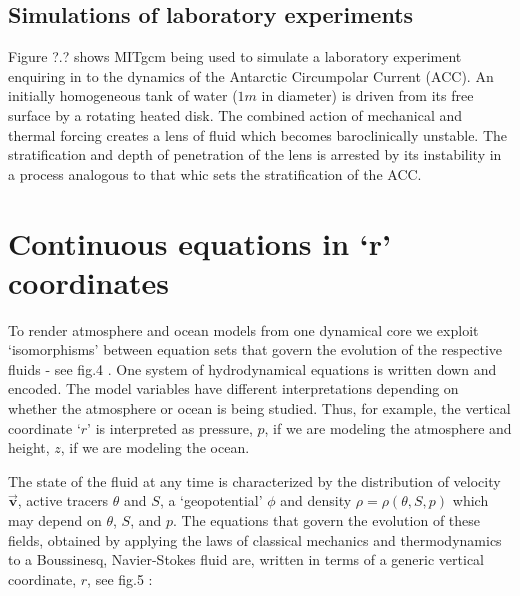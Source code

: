 \documentclass[12pt]{book}
\begin{document}

\subsection{Simulations of laboratory experiments}

Figure ?.? shows MITgcm being used to simulate a laboratory experiment
enquiring in to the dynamics of the Antarctic Circumpolar Current (ACC). An
initially homogeneous tank of water ($1m$ in diameter) is driven from its
free surface by a rotating heated disk. The combined action of mechanical
and thermal forcing creates a lens of fluid which becomes baroclinically
unstable. The stratification and depth of penetration of the lens is
arrested by its instability in a process analogous to that whic sets the
stratification of the ACC.



\section{Continuous equations in `r' coordinates}

To render atmosphere and ocean models from one dynamical core we exploit
`isomorphisms' between equation sets that govern the evolution of the
respective fluids - see fig.4
. One system of hydrodynamical equations is written down
and encoded. The model variables have different interpretations depending on
whether the atmosphere or ocean is being studied. Thus, for example, the
vertical coordinate `$r$' is interpreted as pressure, $p$, if we are
modeling the atmosphere and height, $z$, if we are modeling the ocean.


The state of the fluid at any time is characterized by the distribution of
velocity $\vec{\mathbf{v}}$, active tracers $\theta $ and $S$, a
`geopotential' $\phi $ and density $\rho =\rho (\theta ,S,p)$ which may
depend on $\theta $, $S$, and $p$. The equations that govern the evolution
of these fields, obtained by applying the laws of classical mechanics and
thermodynamics to a Boussinesq, Navier-Stokes fluid are, written in terms of
a generic vertical coordinate, $r$, see fig.5
:
\end{document}
